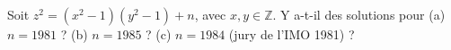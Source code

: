 Soit $z^2 = (x^2 - 1)(y^2 - 1) + n$, avec $x, y \in \mathbb{Z}$. Y a-t-il des solutions pour (a) $n = 1981$ ? (b) $n = 1985$ ? (c) $n = 1984$ (jury de l'IMO 1981) ?
